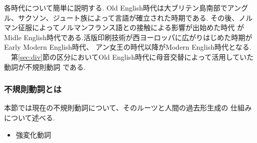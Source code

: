 各時代について簡単に説明する.
Old English時代は大ブリテン島南部でアングル、サクソン、ジュート族によって言語が確立された時期である.
その後、ノルマン征服によってノルマンフランス語との接触による影響が出始めた時代
がMidle English時代である.活版印刷技術が西ヨーロッパに広がりはじめた時期がEarly Modern English時代、
アン女王の時代以降がModern English時代となる.\\
　第\ref{sec:div}節の区分においてOld English時代に母音交替によって活用していた動詞が不規則動詞
である.

\subsubsection{不規則動詞とは}\label{sec:strong_verb}
本節では現在の不規則動詞について、そのルーツと人間の過去形生成の
仕組みについて述べる.

\begin{itemize}
\item 強変化動詞
\end{itemize}

